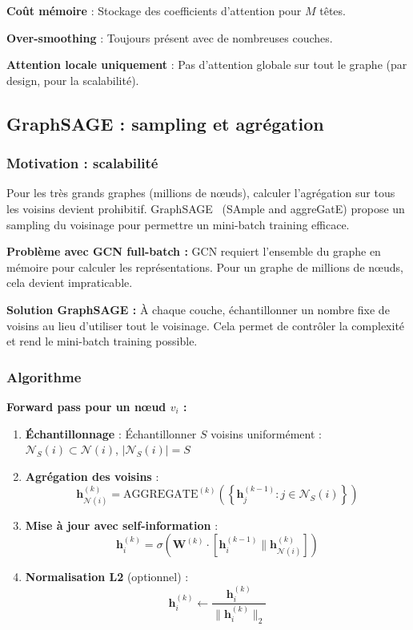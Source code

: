 \textbf{Coût mémoire} : Stockage des coefficients d'attention pour $M$ têtes.

\textbf{Over-smoothing} : Toujours présent avec de nombreuses couches.

\textbf{Attention locale uniquement} : Pas d'attention globale sur tout le graphe (par design, pour la scalabilité).

\subsection{GraphSAGE : sampling et agrégation}

\subsubsection{Motivation : scalabilité}

Pour les très grands graphes (millions de nœuds), calculer l'agrégation sur tous les voisins devient prohibitif. GraphSAGE~\cite{Hamilton2017} (SAmple and aggreGatE) propose un sampling du voisinage pour permettre un mini-batch training efficace.

\textbf{Problème avec GCN full-batch :}
GCN requiert l'ensemble du graphe en mémoire pour calculer les représentations. Pour un graphe de millions de nœuds, cela devient impraticable.

\textbf{Solution GraphSAGE :}
À chaque couche, échantillonner un nombre fixe de voisins au lieu d'utiliser tout le voisinage. Cela permet de contrôler la complexité et rend le mini-batch training possible.

\subsubsection{Algorithme}

\textbf{Forward pass pour un nœud $v_i$ :}

\begin{enumerate}
    \item \textbf{Échantillonnage} : Échantillonner $S$ voisins uniformément : $\mathcal{N}_S(i) \subset \mathcal{N}(i)$, $|\mathcal{N}_S(i)| = S$
    
    \item \textbf{Agrégation des voisins} :
    \[
    \mathbf{h}_{\mathcal{N}(i)}^{(k)} = \text{AGGREGATE}^{(k)}\left(\left\{\mathbf{h}_j^{(k-1)} : j \in \mathcal{N}_S(i)\right\}\right)
    \]
    
    \item \textbf{Mise à jour avec self-information} :
    \[
    \mathbf{h}_i^{(k)} = \sigma\left(\mathbf{W}^{(k)} \cdot [\mathbf{h}_i^{(k-1)} \| \mathbf{h}_{\mathcal{N}(i)}^{(k)}]\right)
    \]
    
    \item \textbf{Normalisation L2} (optionnel) :
    \[
    \mathbf{h}_i^{(k)} \leftarrow \frac{\mathbf{h}_i^{(k)}}{\|\mathbf{h}_i^{(k)}\|_2}
    \]
\end{enumerate}

